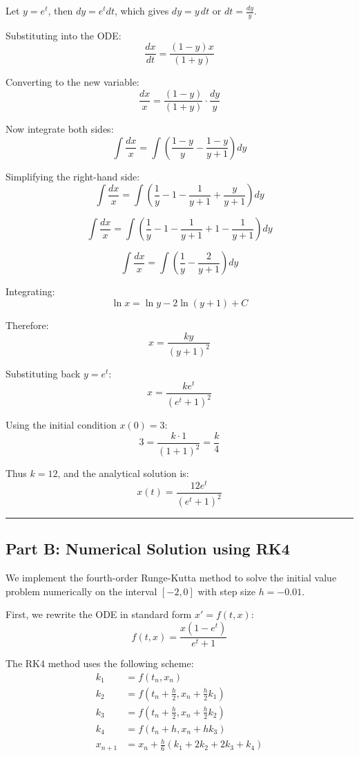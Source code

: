 Let $y = e^t$, then $dy = e^t dt$, which gives $dy = y\, dt$ or $dt = \frac{dy}{y}$.

Substituting into the ODE:
$$\frac{dx}{dt} = \frac{(1-y)x}{(1+y)}$$

Converting to the new variable:
$$\frac{dx}{x} = \frac{(1-y)}{(1+y)} \cdot \frac{dy}{y}$$

Now integrate both sides:
$$\int \frac{dx}{x} = \int \left(\frac{1-y}{y} - \frac{1-y}{y+1}\right) dy$$

Simplifying the right-hand side:
$$\int \frac{dx}{x} = \int \left(\frac{1}{y} - 1 - \frac{1}{y+1} + \frac{y}{y+1}\right) dy$$

$$\int \frac{dx}{x} = \int \left(\frac{1}{y} - 1 - \frac{1}{y+1} + 1 - \frac{1}{y+1}\right) dy$$

$$\int \frac{dx}{x} = \int \left(\frac{1}{y} - \frac{2}{y+1}\right) dy$$

Integrating:
$$\ln x = \ln y - 2\ln(y+1) + C$$

Therefore:
$$x = \frac{ky}{(y+1)^2}$$

Substituting back $y = e^t$:
$$x = \frac{ke^t}{(e^t+1)^2}$$

Using the initial condition $x(0) = 3$:
$$3 = \frac{k \cdot 1}{(1+1)^2} = \frac{k}{4}$$

Thus $k = 12$, and the analytical solution is:
$$\boxed{x(t) = \frac{12e^t}{(e^t+1)^2}}$$

\vspace{2em}
\noindent\rule{\textwidth}{0.4pt}

\clearpage
\subsection*{Part B: Numerical Solution using RK4}

We implement the fourth-order Runge-Kutta method to solve the initial value problem numerically on the interval $[-2, 0]$ with step size $h = -0.01$.

First, we rewrite the ODE in standard form $x' = f(t, x)$:
$$f(t, x) = \frac{x(1 - e^t)}{e^t + 1}$$

The RK4 method uses the following scheme:
\begin{align*}
k_1 &= f(t_n, x_n) \\
k_2 &= f(t_n + \frac{h}{2}, x_n + \frac{h}{2}k_1) \\
k_3 &= f(t_n + \frac{h}{2}, x_n + \frac{h}{2}k_2) \\
k_4 &= f(t_n + h, x_n + hk_3) \\
x_{n+1} &= x_n + \frac{h}{6}(k_1 + 2k_2 + 2k_3 + k_4)
\end{align*}

